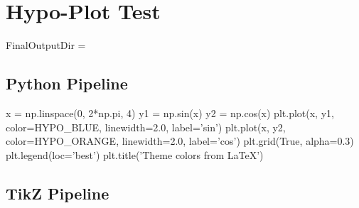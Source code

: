 \documentclass{article}
\begin{document}
\section*{Hypo-Plot Test}
FinalOutputDir = \texttt{\FinalOutputDir}

\subsection*{Python Pipeline}
\begin{HypoPyPlot}[name=demo_sine,width={0.75\linewidth},figwidth=4.8,figheight=2.6,dpi=160,format=png]
x = np.linspace(0, 2*np.pi, 4)
y1 = np.sin(x)
y2 = np.cos(x)
plt.plot(x, y1, color=HYPO_BLUE,  linewidth=2.0, label='sin')
plt.plot(x, y2, color=HYPO_ORANGE, linewidth=2.0, label='cos')
plt.grid(True, alpha=0.3)
plt.legend(loc='best')
plt.title('Theme colors from LaTeX')
\end{HypoPyPlot}

\subsection*{TikZ Pipeline}
\end{document}
